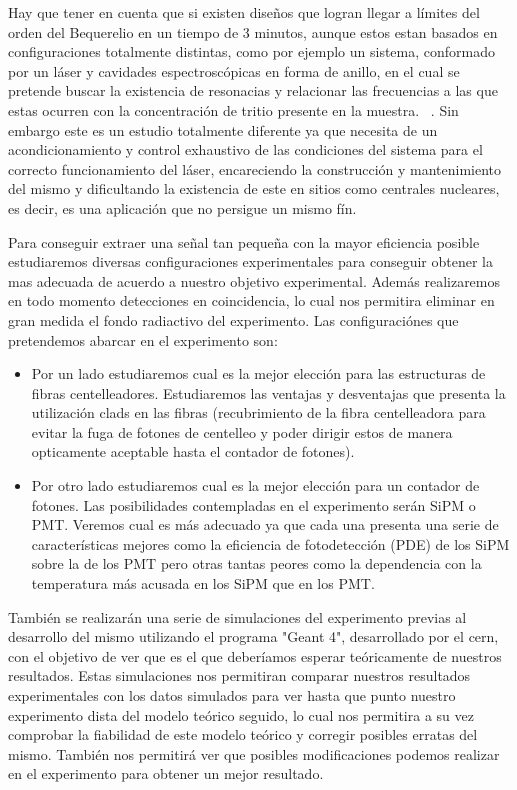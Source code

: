 Hay que tener en cuenta que si existen diseños que logran llegar a límites del orden del Bequerelio en un tiempo de 3 minutos, aunque estos estan basados en configuraciones totalmente distintas, como por ejemplo un sistema, conformado por un láser y cavidades espectroscópicas en forma de anillo, en el cual se pretende buscar la existencia de resonacias y relacionar las frecuencias a las que estas ocurren con la concentración de tritio presente en la muestra. ~\cite{Anillo}. Sin embargo este es un estudio totalmente diferente ya que necesita de un acondicionamiento y control exhaustivo de las condiciones del sistema para el correcto funcionamiento del láser, encareciendo la construcción y mantenimiento del mismo y dificultando la existencia de este en sitios como centrales nucleares, es decir, es una aplicación que no persigue un mismo fín. 

Para conseguir extraer una señal tan pequeña con la mayor eficiencia posible estudiaremos diversas configuraciones experimentales para conseguir obtener la mas adecuada de acuerdo a nuestro objetivo experimental. Además realizaremos en todo momento detecciones en coincidencia, lo cual nos permitira eliminar en gran medida el fondo radiactivo del experimento. Las configuraciónes que pretendemos abarcar en el experimento son: 
\begin{itemize}
\item {}
Por un lado estudiaremos cual es la mejor elección para las estructuras de fibras centelleadores. Estudiaremos las ventajas y desventajas que presenta la utilización clads en las fibras (recubrimiento de la fibra centelleadora para evitar la fuga de fotones de centelleo y poder dirigir estos de manera opticamente aceptable hasta el contador de fotones). 
\item {}
Por otro lado estudiaremos cual es la mejor elección para un contador de fotones. Las posibilidades contempladas en el experimento serán SiPM o PMT. Veremos cual es más adecuado ya que cada una presenta una serie de características mejores como la eficiencia de fotodetección (PDE) de los SiPM sobre la de los PMT pero otras tantas peores como la dependencia con la temperatura más acusada en los SiPM que en los PMT.
\end{itemize}

También se realizarán una serie de simulaciones del experimento previas al desarrollo del mismo utilizando el programa "Geant 4", desarrollado por el cern, con el objetivo de ver que es el que deberíamos esperar teóricamente de nuestros resultados. Estas simulaciones nos permitiran comparar nuestros resultados experimentales con los datos simulados para ver hasta que punto nuestro experimento dista del modelo teórico seguido, lo cual nos permitira a su vez comprobar la fiabilidad de este modelo teórico y corregir posibles erratas del mismo. También nos permitirá ver que posibles modificaciones podemos realizar en el experimento para obtener un mejor resultado.


